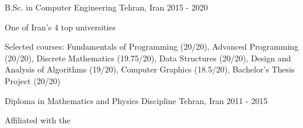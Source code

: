 

\begin{cventries}


  \cventry
    {B.Sc. in Computer Engineering} %
    {} %
    {Tehran, Iran} %
    {2015 - 2020} %
    {
      \begin{cvitems} %
      \item {
      	One of Iran's 4 top universities
      }
        \item {Selected courses: Fundamentals of Programming (20/20), Advanced Programming (20/20), Discrete Mathematics (19.75/20), \newline Data Structures (20/20), Design and Analysis of Algorithms (19/20), Computer Graphics (18.5/20), Bachelor's Thesis Project (20/20)}
      \end{cvitems}
    }

  \cventry
    {Diploma in Mathematics and Physics Discipline} %
    {} %
    {Tehran, Iran} %
    {2011 - 2015} %
    {
      \begin{cvitems} %
        \item {Affiliated with the }
      \end{cvitems}
    }

\end{cventries}
